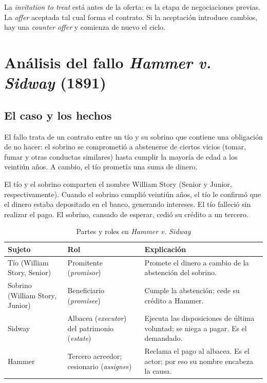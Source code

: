 \documentclass[12pt,oneside]{book}
\begin{document}
\begin{important}
La \textit{invitation to treat} está antes de la oferta: es la etapa de negociaciones previas. La \textit{offer} aceptada tal cual forma el contrato. Si la aceptación introduce cambios, hay una \textit{counter offer} y comienza de nuevo el ciclo.
\end{important}

\section{Análisis del fallo \textit{Hammer v. Sidway} (1891)}
\label{sec:hammer}

\subsection{El caso y los hechos}

El fallo trata de un contrato entre un tío y su sobrino que contiene una obligación de no hacer: el sobrino se comprometió a abstenerse de ciertos vicios (tomar, fumar y otras conductas similares) hasta cumplir la mayoría de edad a los veintiún años. A cambio, el tío prometía una suma de dinero.

El tío y el sobrino comparten el nombre William Story (Senior y Junior, respectivamente). Cuando el sobrino cumplió veintiún años, el tío le confirmó que el dinero estaba depositado en el banco, generando intereses. El tío falleció sin realizar el pago. El sobrino, cansado de esperar, cedió su crédito a un tercero.

\begin{table}[H]
\centering
\caption{Partes y roles en \textit{Hammer v. Sidway}}
\begin{tabularx}{\textwidth}{>{\raggedright\arraybackslash}p{} >{\raggedright\arraybackslash}p{} >{\raggedright\arraybackslash}X}
\toprule
\textbf{Sujeto} & \textbf{Rol} & \textbf{Explicación} \\
\midrule
Tío (William Story, Senior) & Promitente (\textit{promisor}) & Promete el dinero a cambio de la abstención del sobrino. \\
Sobrino (William Story, Junior) & Beneficiario (\textit{promisee}) & Cumple la abstención; cede su crédito a Hammer. \\
Sidway & Albacea (\textit{executor}) del patrimonio (\textit{estate}) & Ejecuta las disposiciones de última voluntad; se niega a pagar. Es el demandado. \\
Hammer & Tercero acreedor; cesionario (\textit{assignee}) & Reclama el pago al albacea. Es el actor; por eso su nombre encabeza la causa. \\
\bottomrule
\end{tabularx}
\end{table}
\end{document}
